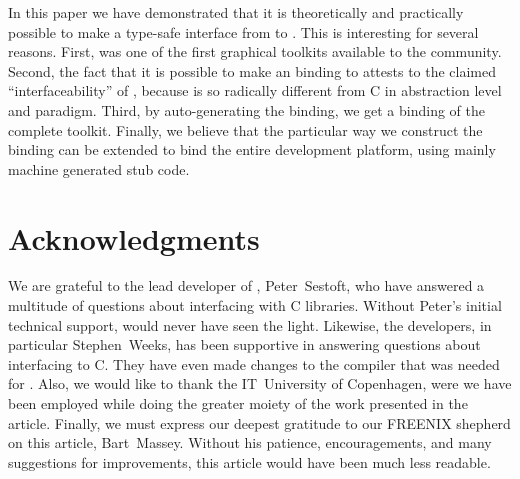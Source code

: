 \documentclass[finalversion]{usetex-v1}
\begin{document}

In this paper we have demonstrated that it is theoretically and
practically possible to make a type-safe interface from \sml to \gtk.
This is interesting for several reasons. First, \mgtk was one of the
first graphical toolkits available to the \sml community. Second, the
fact that it is possible to make an \sml binding to \gtk
attests to the claimed ``interfaceability'' of \gtk, because \sml is so
radically different from C in abstraction level and paradigm. Third,
by auto-generating the binding, we get a binding of the complete \gtk
toolkit. Finally, we believe that the particular way we construct the
binding can be extended to bind the
entire \gnome development platform, using mainly machine generated
stub code.


\section{Acknowledgments}
\label{sec:acknowledgments}

We are grateful to the lead developer of \mosml, Peter~Sestoft, who
have answered a multitude of questions about interfacing \mosml with C
libraries.  Without Peter's initial technical support, \mgtk would
never have seen the light.  Likewise, the \mlton developers, in
particular Stephen~Weeks, has been supportive in answering questions
about interfacing \mlton to C.  They have even made changes to the \mlton
compiler that was needed for \mgtk.  Also, we would like to thank the
IT~University of Copenhagen, were we have been employed while doing the
greater moiety of the work presented in the article.  Finally, we
must express our deepest gratitude to our FREENIX shepherd on this
article, Bart~Massey.  Without his patience, encouragements, and many
suggestions for improvements, this article would have been much less
readable.




\end{document}
